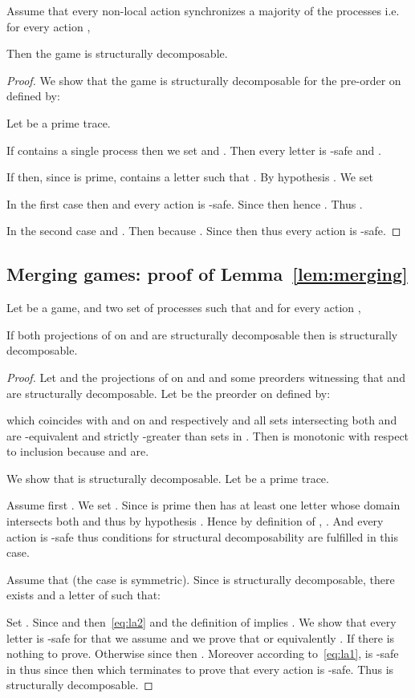 \documentclass[a4paper,UKenglish]{lipics-v2016}
\begin{document}
{Assume that every non-local action synchronizes a majority of the processes i.e. for every action ,

Then the game is  structurally decomposable.
}
\begin{proof}
We show that the game is structurally decomposable for  the pre-order  on  defined by:

Let  be a prime trace.

If  contains a single process  then we set  and . Then every letter  is -safe and .

If 
then, since  is prime,  contains a letter 
such that .
By hypothesis
.
We set


In the first case  then  and
every action is -safe.
Since   then
 hence
.
Thus .

In the second case  and .
Then   because .
Since 
then   thus every action 
is -safe.
\end{proof}


\subsection{Merging games: proof of Lemma~\ref{lem:merging}}
{
Let  be a game,
and 
 two set of processes such that  and for every action ,

If both projections of  on  and  are structurally decomposable then  is structurally decomposable.
}
\begin{proof}
Let  and  the projections of  on  and  and
 some preorders witnessing that  and  are structurally decomposable.
Let   be the preorder on  defined by:

which coincides with  and  on  and  respectively
and all sets intersecting both  and  are -equivalent and strictly -greater than sets in .
Then  is monotonic with respect to inclusion
because  and  are.

We show that  is structurally  decomposable.
Let  be a prime trace.

Assume first .
We set .
Since  is prime 
then  has at least one letter  whose domain intersects both  and 
thus by hypothesis .
Hence by definition of ,
.
And every action is -safe thus conditions for structural decomposability are fulfilled in this case.

Assume that 
(the case  is symmetric).
Since  is structurally  decomposable,
there exists  and a letter  of  such that:

Set .
 Since   
 and 
 then~\eqref{eq:la2} and the definition of 
 implies
  . 
  We show that every letter   is -safe for that we assume  and
  we prove that 
  or equivalently .
  If  there is nothing to prove.
Otherwise since 
  then .
  Moreover
 according to~\eqref{eq:la1},  is -safe in  thus since 
 then 
   which terminates to prove that every action  is -safe. Thus  is structurally decomposable.
\end{proof}
\end{document}
